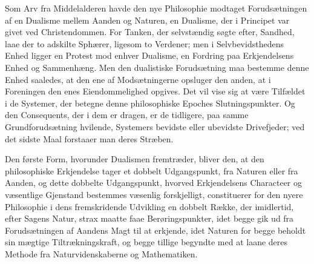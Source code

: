 \documentclass[12pt,a4paper]{book}
\newcommand{\opage}[1]{\marginnote{\footnotesize\textit{[#1]}}}
\begin{document}
Som Arv fra Middelalderen havde den nye Philosophie modtaget
Forudsætningen af en Dualisme mellem Aanden og Naturen, en Dualisme,
der i Principet var givet ved Christendommen. For Tanken, der
selvstændig søgte efter, Sandhed, laae der to adskilte Sphærer,
ligesom to Verdener; men i Selvbevidsthedens Enhed ligger en Protest
mod enhver Dualisme, en Fordring paa Erkjendelsens Enhed og
\opage{7} Sammenhæng. Men den dualistiske Forudsætning maa bestemme denne Enhed
saaledes, at den ene af Modsætningerne opsluger den anden, at i
Foreningen den enes Eiendommelighed opgives. Det vil vise sig at være
Tilfældet i de Systemer, der betegne denne philosophiske Epoches
Slutningspunkter. Og den Consequents, der i dem er dragen, er de
tidligere, paa samme Grundforudsætning hvilende, Systemers bevidste
eller ubevidste Drivefjeder; ved det sidste Maal forstaaer man deres
Stræben.

Den første Form, hvorunder Dualismen fremtræder, bliver den, at den
philosophiske Erkjendelse tager et dobbelt Udgangspunkt, fra Naturen
eller fra Aanden, og dette dobbelte Udgangspunkt, hvorved
Erkjendelsens Characteer og væsentlige Gjenstand bestemmes væsenlig
forskjelligt, constituerer for den nyere Philosophie i dens
fremskridende Udvikling en dobbelt Række, der imidlertid, efter Sagens
Natur, strax maatte faae Berøringspunkter, idet begge gik ud fra
Forudsætningen af Aandens Magt til at erkjende, idet Naturen for begge
beholdt sin mægtige Tiltrækningskraft, og begge tillige begyndte med
at laane deres Methode fra Naturvidenskaberne og Mathematiken.
\end{document}

